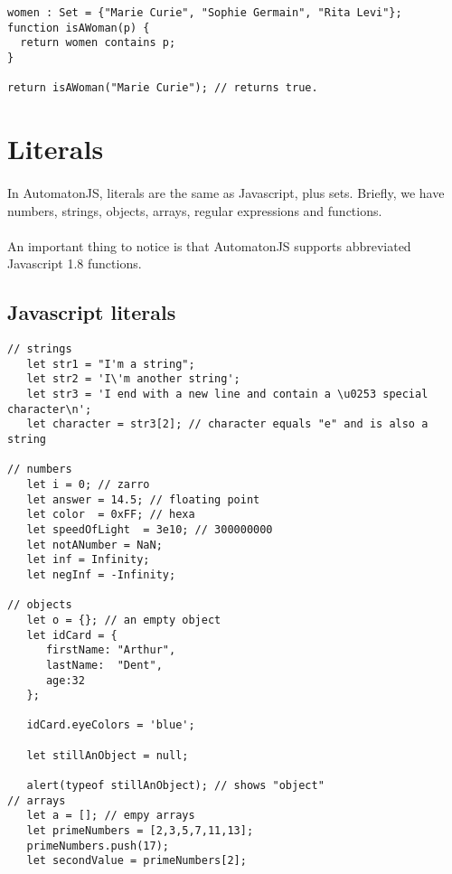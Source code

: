 \documentclass{article}
\begin{document}
\begin{sloppypar}
{\begin{lstlisting}
women : Set = {"Marie Curie", "Sophie Germain", "Rita Levi"};
function isAWoman(p) {
  return women contains p;
}

return isAWoman("Marie Curie"); // returns true.
\end{lstlisting}
}





\section{ Literals}


\paragraph{}
In AutomatonJS, literals are the same as Javascript, plus sets.
   Briefly, we have numbers, strings, objects, arrays, regular expressions and functions.

   
\paragraph{}
An important thing to notice is that AutomatonJS supports abbreviated Javascript 1.8 functions.
   

\subsection{ Javascript literals}

{\begin{lstlisting}
// strings
   let str1 = "I'm a string";
   let str2 = 'I\'m another string';
   let str3 = 'I end with a new line and contain a \u0253 special character\n';
   let character = str3[2]; // character equals "e" and is also a string

// numbers
   let i = 0; // zarro
   let answer = 14.5; // floating point
   let color  = 0xFF; // hexa
   let speedOfLight  = 3e10; // 300000000
   let notANumber = NaN;
   let inf = Infinity;
   let negInf = -Infinity;

// objects
   let o = {}; // an empty object
   let idCard = {
      firstName: "Arthur",
      lastName:  "Dent",
      age:32
   };
   
   idCard.eyeColors = 'blue';

   let stillAnObject = null;
   
   alert(typeof stillAnObject); // shows "object"
// arrays
   let a = []; // empy arrays
   let primeNumbers = [2,3,5,7,11,13];
   primeNumbers.push(17);
   let secondValue = primeNumbers[2];


\end{lstlisting}}
\end{sloppypar}
\end{document}
